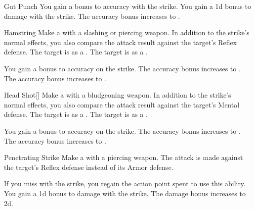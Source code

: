 {\begin{ability}{Gut Punch}
                \rankline
                 You gain a  bonus to accuracy with the strike.
                 You gain a \plus1d bonus to damage with the strike.
                 The accuracy bonus increases to .
            \end{ability}

            \begin{ability}{Hamstring}
                Make a  with a slashing or piercing weapon.
                In addition to the strike's normal effects, you also compare the attack result against the target's Reflex defense.
                \hit The target is  as a .
                \crit The target is  as a .

                \rankline
                 You gain a  bonus to accuracy on the strike.
                 The accuracy bonus increases to .
                 The accuracy bonus increases to .
            \end{ability}

            \begin{ability}{Head Shot}[]
                Make a  with a bludgeoning weapon.
                In addition to the strike's normal effects, you also compare the attack result against the target's Mental defense.
                \hit The target is  as a .
                \crit The target is  as a .

                \rankline
                 You gain a  bonus to accuracy on the strike.
                 The accuracy bonus increases to .
                 The accuracy bonus increases to .
            \end{ability}

            \begin{ability}{Penetrating Strike}
                Make a  with a piercing weapon.
                The attack is made against the target's Reflex defense instead of its Armor defense.

                \rankline
                 If you miss with the strike, you regain the action point spent to use this ability.
                 You gain a \plus1d bonus to damage with the strike.
                 The damage bonus increases to \plus2d.
            \end{ability}

}

